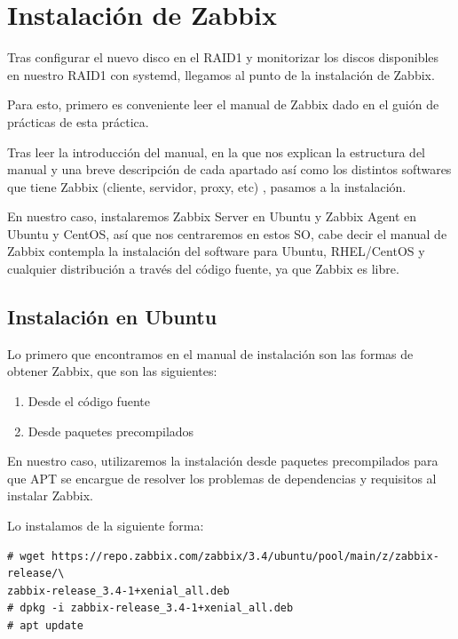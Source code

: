 \documentclass[12pt, spanish]{article}
\begin{document}

\tableofcontents
\pagebreak




\section{Instalación de Zabbix}


Tras configurar el nuevo disco en el RAID1 y monitorizar los discos disponibles en nuestro RAID1 con systemd, llegamos al punto de la instalación de Zabbix.

Para esto, primero es conveniente leer el manual de Zabbix\cite{zabbix_man} dado en el guión de prácticas de esta práctica.

Tras leer la introducción del manual, en la que nos explican la estructura del manual y una breve descripción de cada apartado así como los distintos softwares que tiene Zabbix (cliente, servidor, proxy, etc) , pasamos a la instalación.

En nuestro caso, instalaremos Zabbix Server en Ubuntu y Zabbix Agent en Ubuntu y CentOS,  así que nos centraremos en estos SO, cabe decir el manual de Zabbix contempla la instalación del software para Ubuntu, RHEL/CentOS y cualquier distribución a través del código fuente, ya que Zabbix es libre.

\subsection{Instalación en Ubuntu}

Lo primero que encontramos en el manual de instalación son las formas de obtener Zabbix, que son las siguientes:

\begin{enumerate}
	\item{Desde el código fuente}
	\item{Desde paquetes precompilados}
\end{enumerate}

En nuestro caso, utilizaremos la instalación desde paquetes precompilados para que APT se encargue de resolver los problemas de dependencias y requisitos al instalar Zabbix.

Lo instalamos de la siguiente forma:

\begin{verbatim}
# wget https://repo.zabbix.com/zabbix/3.4/ubuntu/pool/main/z/zabbix-release/\
zabbix-release_3.4-1+xenial_all.deb
# dpkg -i zabbix-release_3.4-1+xenial_all.deb
# apt update
\end{verbatim}
\end{document}
